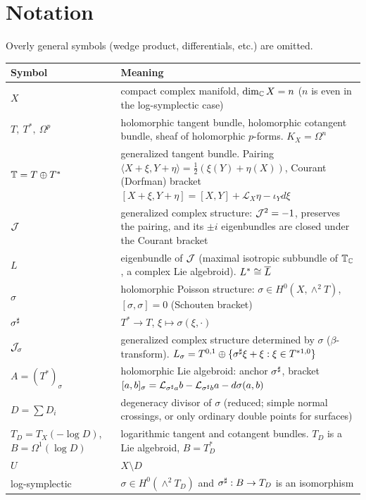 \section{Notation}\label{sec:notation}
Overly general symbols (wedge product, differentials, etc.) are omitted.

\begin{longtable}{>{\raggedright\arraybackslash}p{3.4cm}>{\raggedright\arraybackslash}p{11.6cm}}
\toprule Symbol & Meaning\\ \midrule\endhead
$X$ & compact complex manifold, $\dim_\mathbb C X=n$ ($n$ is even in the log-symplectic case)\\
$T,\ T^*,\ \Omega^p$ & holomorphic tangent bundle, holomorphic cotangent bundle, sheaf of holomorphic $p$-forms. $K_X=\Omega^n$\\
$\mathbb T=T\oplus T^*$ & generalized tangent bundle. Pairing $\langle X+\xi,Y+\eta\rangle=\tfrac12(\xi(Y)+\eta(X))$, Courant (Dorfman) bracket $[X+\xi,Y+\eta]=[X,Y]+\mathcal L_X\eta-\iota_Yd\xi$\\
$\mathcal J$ & generalized complex structure: $\mathcal J^2=-1$, preserves the pairing, and its $\pm i$ eigenbundles are closed under the Courant bracket\\
$L$ & eigenbundle of $\mathcal J$ (maximal isotropic subbundle of $\mathbb T_\mathbb C$, a complex Lie algebroid). $L^*\cong\overline L$\\
$\sigma$ & holomorphic Poisson structure: $\sigma\in H^0(X,\wedge^2T)$, $[\sigma,\sigma]=0$ (Schouten bracket)\\
$\sigma^\sharp$ & $T^*\to T$, $\xi\mapsto\sigma(\xi,\cdot)$\\
$\mathcal J_\sigma$ & generalized complex structure determined by $\sigma$ ($\beta$-transform). $L_\sigma=T^{0,1}\oplus\{\sigma^\sharp\xi+\xi:\xi\in T^{*1,0}\}$\\
$A=(T^*)_\sigma$ & holomorphic Lie algebroid: anchor $\sigma^\sharp$, bracket $[a,b]_\sigma=\mathcal L_{\sigma^\sharp a}b-\mathcal L_{\sigma^\sharp b}a-d\sigma(a,b)$\\
$D=\sum D_i$ & degeneracy divisor of $\sigma$ (reduced; simple normal crossings, or only ordinary double points for surfaces)\\
$T_D=T_X(-\log D)$,\ $B=\Omega^1(\log D)$ & logarithmic tangent and cotangent bundles. $T_D$ is a Lie algebroid, $B=T_D^*$\\
$U$ & $X\setminus D$\\
log-symplectic & $\sigma\in H^0(\wedge^2T_D)$ and $\sigma^\sharp:B\to T_D$ is an isomorphism\\

\end{longtable}
